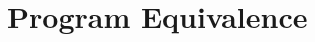 \begin{xltabular}{\linewidth}{>{\hsize=.4\hsize\raggedright\arraybackslash}X>{\hsize=.6\hsize}X}
    \bottomrule
\end{xltabular}
\egroup
\fi

\section{Program Equivalence}
\label{sec:program_equivalence}

